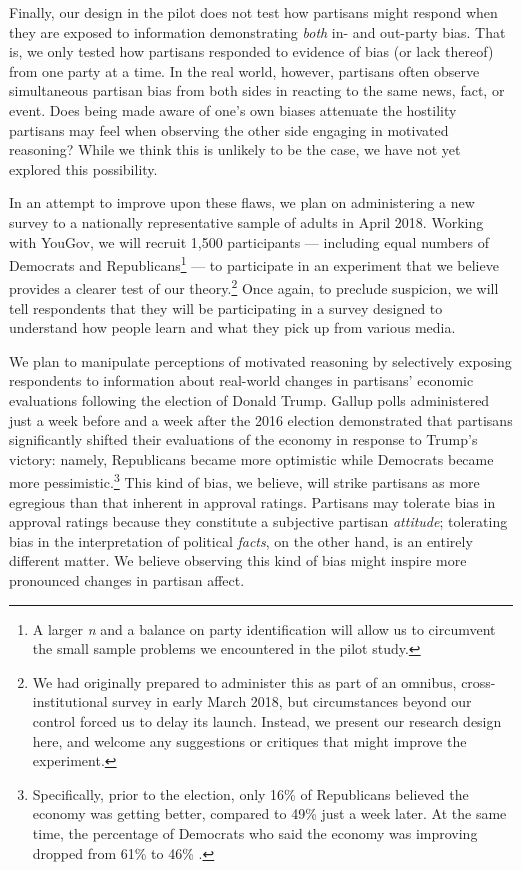 \documentclass[12pt, letterpaper]{article}
\begin{document}
{Finally, our design in the pilot does not test how partisans might respond when they are exposed to information demonstrating \textit{both} in- and out-party bias. That is, we only tested how partisans responded to evidence of bias (or lack thereof) from one party at a time. In the real world, however, partisans often observe simultaneous partisan bias from both sides in reacting to the same news, fact, or event. Does being made aware of one's own biases attenuate the hostility partisans may feel when observing the other side engaging in motivated reasoning? While we think this is unlikely to be the case, we have not yet explored this possibility. 

In an attempt to improve upon these flaws, we plan on administering a new survey to a nationally representative sample of adults in April 2018. Working with YouGov, we will recruit 1,500 participants --- including equal numbers of Democrats and Republicans\footnote{A larger \textit{n} and a balance on party identification will allow us to circumvent the small sample problems we encountered in the pilot study.}  --- to participate in an experiment that we believe provides a clearer test of our theory.\footnote{We had originally prepared to administer this as part of an omnibus, cross-institutional survey in early March 2018, but circumstances beyond our control forced us to delay its launch. Instead, we present our research design here, and welcome any suggestions or critiques that might improve the experiment.} Once again, to preclude suspicion, we will tell respondents that they will be participating in a survey designed to understand how people learn and what they pick up from various media. 

We plan to manipulate perceptions of motivated reasoning by selectively exposing respondents to information about real-world changes in partisans' economic evaluations following the election of Donald Trump. Gallup polls administered just a week before and a week after the 2016 election demonstrated that partisans significantly shifted their evaluations of the economy in response to Trump's victory: namely, Republicans became more optimistic while Democrats became more pessimistic.\footnote{Specifically, prior to the election, only 16\% of Republicans believed the economy was getting better, compared to 49\% just a week later. At the same time, the percentage of Democrats who said the economy was improving dropped from 61\% to 46\% \citep{gallup_econ}.} This kind of bias, we believe, will strike partisans as more egregious than that inherent in approval ratings. Partisans may tolerate bias in approval ratings because they constitute a subjective partisan \textit{attitude}; tolerating bias in the interpretation of political \textit{facts}, on the other hand, is an entirely different matter. We believe observing this kind of bias might inspire more pronounced changes in partisan affect. 

}
\end{document}
